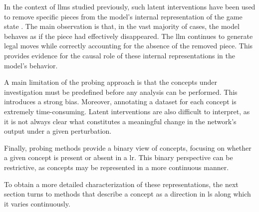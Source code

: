 In the context of \glspl{llm} studied previously, such latent interventions have been used to remove specific pieces from the model's internal representation of the game state \parencite{li2024emergentworldrepresentationsexploring, karvonen2024emergentworldmodelslatent}.
The main observation is that, in the vast majority of cases, the model behaves as if the piece had effectively disappeared.
The \gls{llm} continues to generate legal moves while correctly accounting for the absence of the removed piece.
This provides evidence for the causal role of these internal representations in the model's behavior.

A main limitation of the probing approach is that the concepts under investigation must be predefined before any analysis can be performed.
This introduces a strong bias.
Moreover, annotating a dataset for each concept is extremely time-consuming.
Latent interventions are also difficult to interpret, as it is not always clear what constitutes a meaningful change in the network's output under a given perturbation.

Finally, probing methods provide a binary view of concepts, focusing on whether a given concept is present or absent in a \gls{lr}.
This binary perspective can be restrictive, as concepts may be represented in a more continuous manner.

To obtain a more detailed characterization of these representations, the next section turns to methods that describe a concept as a direction in \gls{ls} along which it varies continuously.